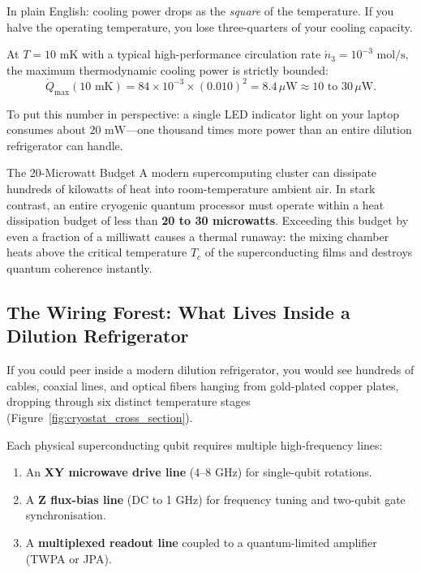 In plain English: cooling power drops as the \textit{square} of the temperature. If you halve the operating temperature, you lose three-quarters of your cooling capacity.

At $T = 10\text{ mK}$ with a typical high-performance circulation rate $\dot{n}_3 = 10^{-3}\text{ mol/s}$, the maximum thermodynamic cooling power is strictly bounded:
\begin{equation}
    \dot{Q}_{\text{max}}(10\text{ mK}) = 84 \times 10^{-3} \times (0.010)^2 = 8.4\,\mu\text{W} \approx 10\text{ to }30\,\mu\text{W}.
\end{equation}

To put this number in perspective: a single LED indicator light on your laptop consumes about $20\text{ mW}$---one thousand times more power than an entire dilution refrigerator can handle.

\begin{hardwarebox}{The 20-Microwatt Budget}
A modern supercomputing cluster can dissipate hundreds of kilowatts of heat into room-temperature ambient air. In stark contrast, an entire cryogenic quantum processor must operate within a heat dissipation budget of less than \textbf{20 to 30 microwatts}. Exceeding this budget by even a fraction of a milliwatt causes a thermal runaway: the mixing chamber heats above the critical temperature $T_c$ of the superconducting films and destroys quantum coherence instantly.
\end{hardwarebox}

\subsection{The Wiring Forest: What Lives Inside a Dilution Refrigerator}
\label{sec:wiring_forest}

If you could peer inside a modern dilution refrigerator, you would see hundreds of cables, coaxial lines, and optical fibers hanging from gold-plated copper plates, dropping through six distinct temperature stages (Figure~\ref{fig:cryostat_cross_section}).

Each physical superconducting qubit requires multiple high-frequency lines:
\begin{enumerate}
    \item An \textbf{XY microwave drive line} (4--8 GHz) for single-qubit rotations.
    \item A \textbf{Z flux-bias line} (DC to 1 GHz) for frequency tuning and two-qubit gate synchronisation.
    \item A \textbf{multiplexed readout line} coupled to a quantum-limited amplifier (TWPA or JPA).
\end{enumerate}

